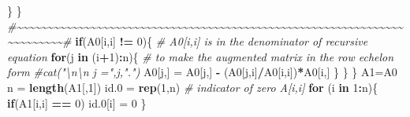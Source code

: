 \documentclass[
]{book}
\newenvironment{Shaded}{\begin{snugshade}}{\end{snugshade}}
\newcommand{\CommentTok}[1]{\textcolor[rgb]{0.56,0.35,0.01}{\textit{#1}}}
\newcommand{\ControlFlowTok}[1]{\textcolor[rgb]{0.13,0.29,0.53}{\textbf{#1}}}
\newcommand{\DecValTok}[1]{\textcolor[rgb]{0.00,0.00,0.81}{#1}}
\newcommand{\FloatTok}[1]{\textcolor[rgb]{0.00,0.00,0.81}{#1}}
\newcommand{\FunctionTok}[1]{\textcolor[rgb]{0.13,0.29,0.53}{\textbf{#1}}}
\newcommand{\NormalTok}[1]{#1}
\newcommand{\OtherTok}[1]{\textcolor[rgb]{0.56,0.35,0.01}{#1}}
\newcommand{\SpecialCharTok}[1]{\textcolor[rgb]{0.81,0.36,0.00}{\textbf{#1}}}
\begin{document}
\begin{Shaded}
\begin{Highlighting}[]
\NormalTok{            \}}
\NormalTok{        \}}
      \CommentTok{\#\textasciitilde{}\textasciitilde{}\textasciitilde{}\textasciitilde{}\textasciitilde{}\textasciitilde{}\textasciitilde{}\textasciitilde{}\textasciitilde{}\textasciitilde{}\textasciitilde{}\textasciitilde{}\textasciitilde{}\textasciitilde{}\textasciitilde{}\textasciitilde{}\textasciitilde{}\textasciitilde{}\textasciitilde{}\textasciitilde{}\textasciitilde{}\textasciitilde{}\textasciitilde{}\textasciitilde{}\textasciitilde{}\textasciitilde{}\textasciitilde{}\textasciitilde{}\textasciitilde{}\textasciitilde{}\textasciitilde{}\textasciitilde{}\textasciitilde{}\textasciitilde{}\textasciitilde{}\textasciitilde{}\textasciitilde{}\textasciitilde{}\textasciitilde{}\textasciitilde{}\textasciitilde{}\textasciitilde{}\textasciitilde{}\textasciitilde{}\textasciitilde{}\textasciitilde{}\textasciitilde{}\textasciitilde{}\textasciitilde{}\textasciitilde{}\textasciitilde{}\textasciitilde{}\textasciitilde{}\textasciitilde{}\textasciitilde{}\textasciitilde{}\textasciitilde{}\textasciitilde{}\textasciitilde{}\textasciitilde{}\textasciitilde{}\textasciitilde{}\textasciitilde{}\textasciitilde{}\textasciitilde{}\textasciitilde{}\textasciitilde{}\textasciitilde{}\textasciitilde{}\textasciitilde{}\textasciitilde{}\textasciitilde{}\#}
       \ControlFlowTok{if}\NormalTok{(A0[i,i] }\SpecialCharTok{!=} \DecValTok{0}\NormalTok{)\{    }\CommentTok{\# A0[i,i] is in the denominator of recursive equation}
          \ControlFlowTok{for}\NormalTok{(j }\ControlFlowTok{in}\NormalTok{ (i}\SpecialCharTok{+}\DecValTok{1}\NormalTok{)}\SpecialCharTok{:}\NormalTok{n)\{  }\CommentTok{\# to make the augmented matrix in the row echelon form}
             \CommentTok{\#cat("\textbackslash{}n\textbackslash{}n j =",j,".")}
\NormalTok{             A0[j,] }\OtherTok{=}\NormalTok{ A0[j,] }\SpecialCharTok{{-}}\NormalTok{ (A0[j,i]}\SpecialCharTok{/}\NormalTok{A0[i,i])}\SpecialCharTok{*}\NormalTok{A0[i,]}
\NormalTok{           \}}
\NormalTok{        \}}
\NormalTok{    \}}
\NormalTok{    A1}\OtherTok{=}\NormalTok{A0  }
\NormalTok{    n }\OtherTok{=} \FunctionTok{length}\NormalTok{(A1[,}\DecValTok{1}\NormalTok{])}
\NormalTok{    id}\FloatTok{.0} \OtherTok{=} \FunctionTok{rep}\NormalTok{(}\DecValTok{1}\NormalTok{,n)                     }\CommentTok{\# indicator of zero A[i,i]}
    \ControlFlowTok{for}\NormalTok{ (i }\ControlFlowTok{in} \DecValTok{1}\SpecialCharTok{:}\NormalTok{n)\{}
          \ControlFlowTok{if}\NormalTok{(A1[i,i] }\SpecialCharTok{==} \DecValTok{0}\NormalTok{) id}\FloatTok{.0}\NormalTok{[i] }\OtherTok{=} \DecValTok{0}
\NormalTok{        \}}

\end{Highlighting}
\end{Shaded}
\end{document}
